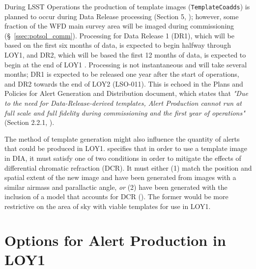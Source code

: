 \documentclass[DM,toc]{lsstdoc}
\begin{document}
During LSST Operations the production of template images ({\tt TemplateCoadds}) is planned to occur during Data Release processing (Section 5, ); however, some fraction of the WFD main survey area will be imaged during commissioning (\S~\ref{ssec:potsol_comm}).
Processing for Data Release 1 (DR1), which will be based on the first six months of data, is expected to begin halfway through LOY1, and DR2, which will be based the first 12 months of data, is expected to begin at the end of LOY1 .
Processing is not instantaneous and will take several months; DR1 is expected to be released one year after the start of operations, and DR2 towards the end of LOY2 (LSO-011).
This is echoed in the Plans and Policies for Alert Generation and Distribution document, which states that {\it "Due to the need for Data-Release-derived templates, Alert Production cannot run at full scale and full fidelity during commissioning and the first year of operations"} (Section 2.2.1, ). 

The method of template generation might also influence the quantity of alerts that could be produced in LOY1.
 specifies that in order to use a template image in DIA, it must satisfy one of two conditions in order to mitigate the effects of differential chromatic refraction (DCR).
It must either (1) match the position and spatial extent of the new image and have been generated from images with a similar airmass and parallactic angle, {\em or} (2) have been generated with the inclusion of a model that accounts for DCR ().
The former would be more restrictive on the area of sky with viable templates for use in LOY1.

\clearpage
\section{Options for Alert Production in LOY1}\label{sec:potsol}
\end{document}
